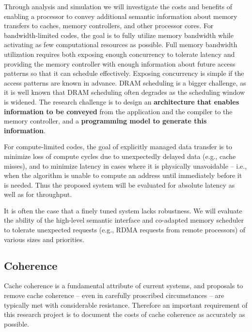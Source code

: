  Through analysis and simulation we
will investigate the costs and benefits of enabling a processor to
convey additional semantic information about memory transfers to
caches, memory controllers, and other processor cores.  For
bandwidth-limited codes, the goal is to fully utilize memory bandwidth
while activating as few computational resources as possible.  Full
memory bandwidth utilization requires both exposing enough concurrency
to tolerate latency and providing the memory controller with enough
information about future access patterns so that it can schedule
effectively.  Exposing concurrency is simple if the access patterns
are known in advance.  DRAM scheduling is a bigger challenge, as it is
well known that DRAM scheduling often degrades as the scheduling
window is widened.  The research challenge is to design an
\textbf{architecture that enables information to be conveyed}
from the application and the
compiler to the memory controller, and a \textbf{programming model
to generate this information}.

 For compute-limited codes, the goal of
explicitly managed data transfer is to minimize loss of compute cycles
due to unexpectedly delayed data (e.g., cache misses), and to minimize
latency in cases where it is physically unavoidable -- i.e., when the
algorithm is unable to compute an address until immediately before it
is needed.  Thus the proposed system will be evaluated for absolute
latency as well as for throughput.

 It is often the case that a finely
tuned system lacks robustness.  We will evaluate the ability of the
high-level semantic interface and co-adapted memory scheduler to
tolerate unexpected requests (e.g., RDMA requests from remote
processors) of various sizes and priorities.


\subsection{Coherence}
\label{sec:proposed-coherence}

Cache coherence is a fundamental attribute of current systems, and proposals
to remove cache coherence -- even in carefully proscribed circumstances -- are
typically met with considerable resistance.   Therefore an important requirement
of this research project is to document the costs of cache coherence as accurately
as possible.

